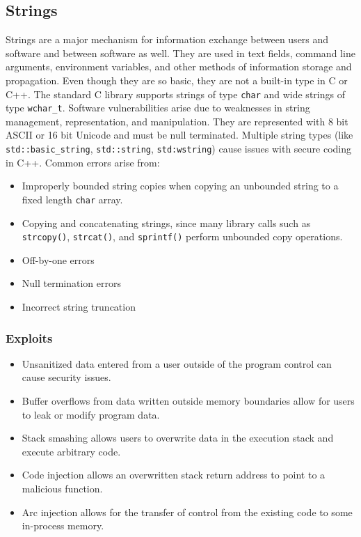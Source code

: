 \documentclass{math}
\begin{document}
\subsection*{Strings}
Strings are a major mechanism for information exchange between users and
software and between software as well. They are used in text fields, command
line arguments, environment variables, and other methods of information storage
and propagation. Even though they are so basic, they are not a built-in type
in C or C++. The standard C library supports strings of type \texttt{char} and
wide strings of type \texttt{wchar\_t}. Software vulnerabilities arise due to
weaknesses in string management, representation, and manipulation. They
are represented with 8 bit ASCII or 16 bit Unicode and must be null terminated.
Multiple string types (like \texttt{std::basic\_string}, \texttt{std::string},
\texttt{std:wstring}) cause issues with secure coding in C++. Common errors
arise from:
\begin{itemize}
  \item Improperly bounded string copies when copying an unbounded string to a
  fixed length \texttt{char} array.
  \item Copying and concatenating strings, since many library calls such as
  \texttt{strcopy()}, \texttt{strcat()}, and \texttt{sprintf()} perform
  unbounded copy operations.
  \item Off-by-one errors
  \item Null termination errors
  \item Incorrect string truncation
\end{itemize}

\subsubsection*{Exploits}
\begin{itemize}
  \item Unsanitized data entered from a user outside of the program control can
  cause security issues.
  \item Buffer overflows from data written outside memory boundaries allow for
  users to leak or modify program data.
  \item Stack smashing allows users to overwrite data in the execution stack and
  execute arbitrary code.
  \item Code injection allows an overwritten stack return address to point to
  a malicious function.
  \item Arc injection allows for the transfer of control from the existing code
  to some in-process memory.
\end{itemize}
\end{document}
